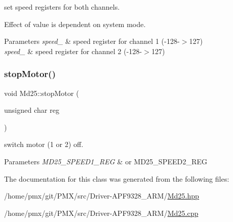 set speed registers for both channels. 

Effect of value is dependent on system mode.


\begin{DoxyParams}{Parameters}
{\em speed\+\_} & speed register for channel 1 (-\/128-\/$>$127) \\
\hline
{\em speed\+\_} & speed register for channel 2 (-\/128-\/$>$127) \\
\hline
\end{DoxyParams}
\mbox{\label{classMd25_a009f1a95005464e6f1cf06a81bb2319f}} 
\subsubsection{\texorpdfstring{stop\+Motor()}{stopMotor()}}
{\footnotesize\ttfamily void Md25\+::stop\+Motor (\begin{DoxyParamCaption}\item[{unsigned char}]{reg }\end{DoxyParamCaption})}



switch motor (1 or 2) off. 


\begin{DoxyParams}{Parameters}
{\em M\+D25\+\_\+\+S\+P\+E\+E\+D1\+\_\+\+R\+EG} & or M\+D25\+\_\+\+S\+P\+E\+E\+D2\+\_\+\+R\+EG \\
\hline
\end{DoxyParams}


The documentation for this class was generated from the following files\+:\begin{DoxyCompactItemize}
\item 
/home/pmx/git/\+P\+M\+X/src/\+Driver-\/\+A\+P\+F9328\+\_\+\+A\+R\+M/\hyperlink{Md25_8hpp}{Md25.\+hpp}\item 
/home/pmx/git/\+P\+M\+X/src/\+Driver-\/\+A\+P\+F9328\+\_\+\+A\+R\+M/\hyperlink{Md25_8cpp}{Md25.\+cpp}\end{DoxyCompactItemize}
